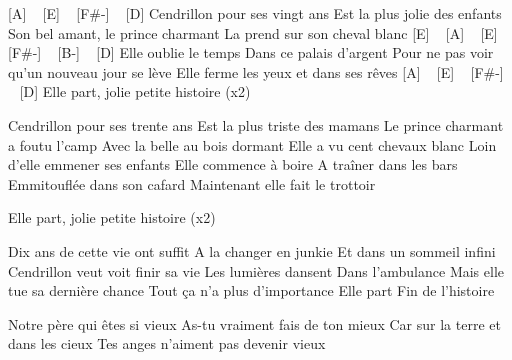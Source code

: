 
[A] ~ [E] ~ [F#-] ~ [D]
Cendrillon pour ses vingt ans
Est la plus jolie des enfants
Son bel amant, le prince charmant
La prend sur son cheval blanc
[E] ~ [A] ~ [E] ~ [F#-] ~ [B-] ~ [D]
Elle oublie le temps
Dans ce palais d'argent
Pour ne pas voir qu'un nouveau jour se lève
Elle ferme les yeux et dans ses rêves
[A] ~ [E] ~ [F#-] ~ [D]
Elle part, jolie petite histoire (x2)

Cendrillon pour ses trente ans
Est la plus triste des mamans
Le prince charmant a foutu l'camp
Avec la belle au bois dormant
Elle a vu cent chevaux blanc
Loin d'elle emmener ses enfants
Elle commence à boire
A traîner dans les bars
Emmitouflée dans son cafard
Maintenant elle fait le trottoir

Elle part, jolie petite histoire (x2)


Dix ans de cette vie ont suffit
A la changer en junkie
Et dans un sommeil infini
Cendrillon veut voit finir sa vie
Les lumières dansent
Dans l'ambulance
Mais elle tue sa dernière chance
Tout ça n'a plus d'importance
Elle part
Fin de l'histoire

Notre père qui êtes si vieux
As-tu vraiment fais de ton mieux
Car sur la terre et dans les cieux
Tes anges n'aiment pas devenir vieux 